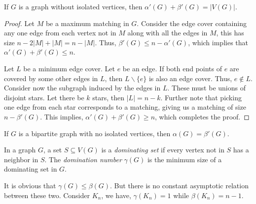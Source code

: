 \begin{theorem}[Gallai, 1959]
    If $G$ is a graph without isolated vertices, then $\alpha'(G) + \beta'(G) = |V(G)|$.
\end{theorem}
\begin{proof}
    Let $M$ be a maximum matching in $G$. Consider the edge cover containing any one edge from each vertex not in $M$ along with all the edges in $M$, this has size $n - 2|M| + |M| = n - |M|$. Thus, $\beta'(G)\le n - \alpha'(G)$, which implies that $\alpha'(G) + \beta'(G)\le n$.

    Let $L$ be a minimum edge cover. Let $e$ be an edge. If both end points of $e$ are covered by some other edges in $L$, then $L\backslash\{e\}$ is also an edge cover. Thus, $e\notin L$. Consider now the subgraph induced by the edges in $L$. These must be unions of disjoint stars. Let there be $k$ stars, then $|L| = n - k$. Further note that picking one edge from each star corresponds to a matching, giving us a matching of size $n - \beta'(G)$. This implies, $\alpha'(G) + \beta'(G)\ge n$, which completes the proof.
\end{proof}
\begin{corollary}
    If $G$ is a bipartite graph with no isolated vertices, then $\alpha(G) = \beta'(G)$.
\end{corollary}

\begin{definition}
    In a graph $G$, a set $S\subseteq V(G)$ is a \textit{dominating set} if every vertex not in $S$ has a neighbor in $S$. The \textit{domination number} $\gamma(G)$ is the minimum size of a dominating set in $G$.
\end{definition}

It is obvious that $\gamma(G)\le\beta(G)$. But there is no constant asymptotic relation between these two. Consider $K_n$, we have, $\gamma(K_n) = 1$ while $\beta(K_n) = n - 1$.

